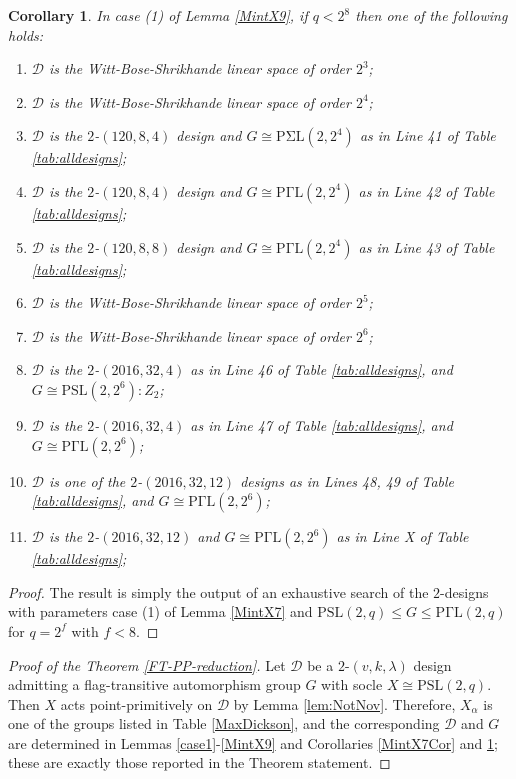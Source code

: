 \documentclass[a4paper,twopage,reqno,12pt]{amsart}
\newtheorem{corollary}[theorem]{Corollary}
\theoremstyle{definition}
\numberwithin{equation}{section}
\newcommand{\PSL}{\mathrm{PSL}}
\newcommand{\PGaL}{\mathrm{P\Gamma L}}
\newcommand{\PSigL}{\mathrm{P\Sigma L}}
\renewcommand{\leq}{\leqslant}
\begin{document}
\begin{corollary}\label{MintX9Cor} In case (1) of Lemma \ref{MintX9}, if $q<2^{8}$ then one of the following holds:
\begin{enumerate}
    \item $\mathcal{D}$ is the Witt-Bose-Shrikhande linear space of order $2^{3}$;
    \item $\mathcal{D}$ is the Witt-Bose-Shrikhande linear space of order $2^{4}$;
    \item $\mathcal{D}$ is the $2$-$(120,8,4)$ design and $G\cong \PSigL(2,2^{4})$ as in Line 41 of Table \ref{tab:alldesigns};
    \item $\mathcal{D}$ is the $2$-$(120,8,4)$ design and $G\cong \PGaL(2,2^{4})$ as in Line 42 of Table \ref{tab:alldesigns};
    \item $\mathcal{D}$ is the $2$-$(120,8,8)$ design and $G\cong \PGaL(2,2^{4})$ as in Line 43 of Table \ref{tab:alldesigns};
    \item $\mathcal{D}$ is the Witt-Bose-Shrikhande linear space of order $2^{5}$;
    \item $\mathcal{D}$ is the Witt-Bose-Shrikhande linear space of order $2^{6}$;
    \item $\mathcal{D}$ is the $2$-$(2016,32,4)$ as in Line 46 of Table \ref{tab:alldesigns}, and $G\cong \PSL(2,2^{6}):Z_{2}$;
    \item $\mathcal{D}$ is the $2$-$(2016,32,4)$ as in Line 47 of Table \ref{tab:alldesigns}, and $G\cong \PGaL(2,2^{6})$;
    \item $\mathcal{D}$ is one of the $2$-$(2016,32,12)$ designs as in Lines 48, 49 of Table \ref{tab:alldesigns}, and $G\cong \PGaL(2,2^{6})$;
     \item $\mathcal{D}$ is the $2$-$(2016,32,12)$ and $G\cong \PGaL(2,2^{6})$ as in Line X of Table \ref{tab:alldesigns};
\end{enumerate}    
\end{corollary}
\begin{proof}
The result is simply the output of an exhaustive search of the $2$-designs with parameters case (1) of Lemma \ref{MintX7} and $\PSL(2,q)\leq G \leq \PGaL(2,q)$ for $q=2^{f}$ with $f<8$.
\end{proof}

\bigskip

\begin{proof}[Proof of the Theorem \ref{FT-PP-reduction}]
Let $\mathcal{D}$ be a $2$-$(v,k,\lambda)$ design admitting a flag-transitive automorphism group $G$ with socle $X \cong \PSL(2,q)$. Then $X$ acts point-primitively on $\mathcal{D}$ by Lemma \ref{lem:NotNov}. Therefore, $X_{\alpha}$ is one of the groups listed in Table \ref{MaxDickson}, and the corresponding $\mathcal{D}$ and $G$ are determined in Lemmas \ref{case1}-\ref{MintX9} and Corollaries \ref{MintX7Cor} and \ref{MintX9Cor}; these are exactly those reported in the Theorem statement.    
\end{proof}
\end{document}
